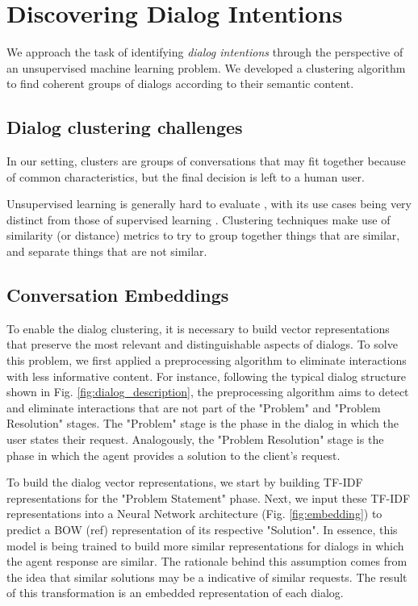 \documentclass[11pt,a4paper]{article}
\begin{document}
\section{Discovering Dialog Intentions}

We approach the task of identifying \textit{dialog intentions} through the perspective of an unsupervised machine learning problem. We developed a clustering algorithm to find coherent groups of dialogs according to their semantic content.

\subsection{Dialog clustering challenges}
In our setting, clusters are groups of conversations that may fit together because of common characteristics, but the final decision is left to a human user.

Unsupervised learning is generally hard to evaluate \cite{}, with its use cases being very distinct from those of supervised learning \cite{}. Clustering techniques make use of similarity (or distance) metrics to try to group together things that are similar, and separate things that are not similar.



\subsection{Conversation Embeddings}

To enable the dialog clustering, it is necessary to build vector representations that preserve the most relevant and distinguishable aspects of dialogs. To solve this problem, we first applied a preprocessing algorithm to eliminate  interactions with less informative content. For instance, following the typical dialog structure shown in Fig. \ref{fig:dialog_description}, the preprocessing algorithm aims to detect and eliminate interactions that are not part of the "Problem" and "Problem Resolution" stages. The "Problem" stage is the phase in the dialog in which the user states their request. Analogously, the "Problem Resolution" stage is the phase in which the agent provides a solution to the client's request. 

To build the dialog vector representations, we start by building TF-IDF representations for the "Problem Statement" phase. Next, we input these TF-IDF representations into a Neural Network architecture (Fig. \ref{fig:embedding}) to predict a BOW (ref) representation of its respective "Solution". In essence, this model is being trained to build more similar representations for dialogs in which the agent response are similar. The rationale behind this assumption comes from the idea that similar solutions may be a indicative of similar requests. The result of this transformation is an embedded representation of each dialog. 
\end{document}
